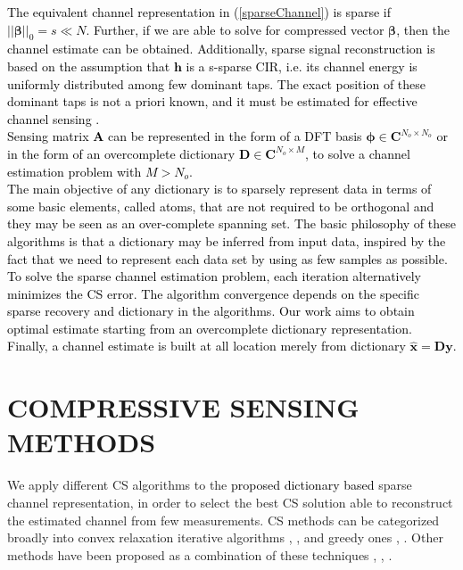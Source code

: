  \textcolor{black}{
The equivalent channel representation in (\ref{sparseChannel}) is sparse if $||\mathbf{\beta}||_0=s\ll N$. Further, if we are able to solve for compressed vector $\mathbf{\beta}$, then the channel estimate can be obtained.
 Additionally, sparse signal reconstruction is based on the assumption that $\mathbf{h}$ is a s-sparse CIR, i.e. its channel energy is uniformly distributed among few dominant taps. The exact position of these dominant taps is not a priori known, and it must be estimated for effective channel sensing \cite{review17}.\\
Sensing matrix $\mathbf{A}$ can be represented in the form of a DFT basis $\mathbf{\phi}\in \mathbf{C}^{N_o\times N_o}$ or in  the form of an overcomplete dictionary  $\mathbf{D}\in \mathbf{C}^{N_o\times M}$, to solve a channel estimation problem with $M>N_o$.\\
The main objective of any dictionary is to sparsely represent data in terms of some basic elements, called atoms, that are not required to be orthogonal and they may be seen as an over-complete spanning set.
The basic philosophy of these algorithms is that a dictionary may be inferred from input data, inspired by the fact that we need to represent each data set by using as few samples as possible. \\
To solve the sparse channel estimation problem, each iteration alternatively minimizes the CS error.
The algorithm convergence depends on the specific sparse recovery and dictionary in the algorithms. Our work aims to obtain optimal estimate starting from an overcomplete dictionary representation.
Finally, a channel estimate is built at all location merely from dictionary $\mathbf{\hat{x}=Dy}$. }
\section{COMPRESSIVE SENSING METHODS}
\label{formulation}
We apply different CS algorithms to the \textcolor{black}{proposed dictionary based} sparse channel representation, in order to select the best CS solution able to reconstruct the estimated channel from few measurements.
CS methods can be categorized broadly into convex relaxation iterative algorithms \cite{Donoho06}, \cite{Candes08}, and greedy ones \cite{Masood13}, \cite{Dai09}. Other methods have been proposed as a combination of these techniques \cite{Donoho12}, \cite{CoSaMP09}, \cite{Wang12}. 
